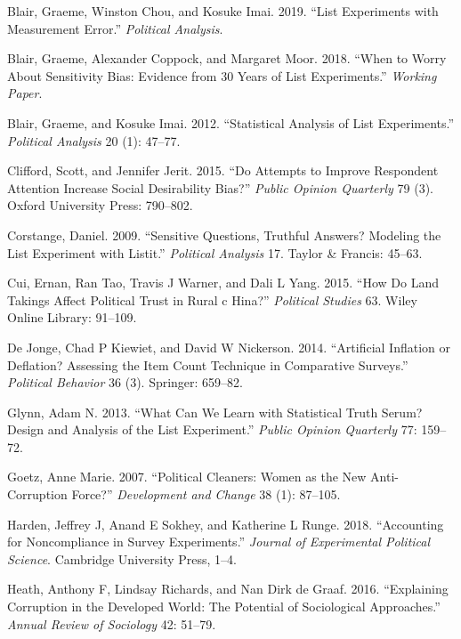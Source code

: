 \documentclass[]{article}
\begin{document}
\leavevmode\hypertarget{ref-blair2019list}{}%
Blair, Graeme, Winston Chou, and Kosuke Imai. 2019. ``List Experiments
with Measurement Error.'' \emph{Political Analysis}.

\leavevmode\hypertarget{ref-blair2018worry}{}%
Blair, Graeme, Alexander Coppock, and Margaret Moor. 2018. ``When to
Worry About Sensitivity Bias: Evidence from 30 Years of List
Experiments.'' \emph{Working Paper}.

\leavevmode\hypertarget{ref-blair2012statistical}{}%
Blair, Graeme, and Kosuke Imai. 2012. ``Statistical Analysis of List
Experiments.'' \emph{Political Analysis} 20 (1): 47--77.

\leavevmode\hypertarget{ref-clifford2015attempts}{}%
Clifford, Scott, and Jennifer Jerit. 2015. ``Do Attempts to Improve
Respondent Attention Increase Social Desirability Bias?'' \emph{Public
Opinion Quarterly} 79 (3). Oxford University Press: 790--802.

\leavevmode\hypertarget{ref-corstange2009listit}{}%
Corstange, Daniel. 2009. ``Sensitive Questions, Truthful Answers?
Modeling the List Experiment with Listit.'' \emph{Political Analysis}
17. Taylor \& Francis: 45--63.

\leavevmode\hypertarget{ref-cui2015land}{}%
Cui, Ernan, Ran Tao, Travis J Warner, and Dali L Yang. 2015. ``How Do
Land Takings Affect Political Trust in Rural c Hina?'' \emph{Political
Studies} 63. Wiley Online Library: 91--109.

\leavevmode\hypertarget{ref-de2014artificial}{}%
De Jonge, Chad P Kiewiet, and David W Nickerson. 2014. ``Artificial
Inflation or Deflation? Assessing the Item Count Technique in
Comparative Surveys.'' \emph{Political Behavior} 36 (3). Springer:
659--82.

\leavevmode\hypertarget{ref-glynn2013can}{}%
Glynn, Adam N. 2013. ``What Can We Learn with Statistical Truth Serum?
Design and Analysis of the List Experiment.'' \emph{Public Opinion
Quarterly} 77: 159--72.

\leavevmode\hypertarget{ref-goetz2007cleaners}{}%
Goetz, Anne Marie. 2007. ``Political Cleaners: Women as the New
Anti-Corruption Force?'' \emph{Development and Change} 38 (1): 87--105.

\leavevmode\hypertarget{ref-harden2018accounting}{}%
Harden, Jeffrey J, Anand E Sokhey, and Katherine L Runge. 2018.
``Accounting for Noncompliance in Survey Experiments.'' \emph{Journal of
Experimental Political Science}. Cambridge University Press, 1--4.

\leavevmode\hypertarget{ref-heath2016explaining}{}%
Heath, Anthony F, Lindsay Richards, and Nan Dirk de Graaf. 2016.
``Explaining Corruption in the Developed World: The Potential of
Sociological Approaches.'' \emph{Annual Review of Sociology} 42: 51--79.
\end{document}
